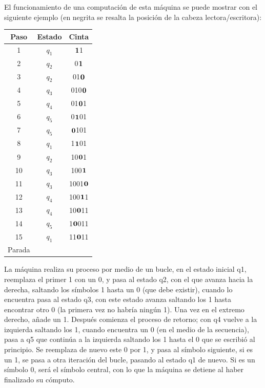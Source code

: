 \documentclass[12pt,a4paper,spanish]{book}
\begin{document}
\begin{itemize}
El funcionamiento de una computaci\'on de esta m\'aquina se puede mostrar con el siguiente ejemplo (en negrita se resalta la posici\'on de la cabeza lectora/escritora):\\
\begin{center}
\begin{tabular}{||c|c|c||}
\hline
Paso & Estado & Cinta\\
\hline
1 & $q_{1}$ & $\bf{1}$1\\
\hline
2 & $q_{2}$ & 0$\bf{1}$\\
\hline
3 & $q_{2}$ & 01$\bf{0}$\\
\hline
4 & $q_{3}$ & 010$\bf{0}$\\
\hline
5 & $q_{4}$ & 01$\bf{0}$1\\
\hline
6 & $q_{5}$ & 0$\bf{1}$01\\
\hline
7 & $q_{5}$ & $\bf{0}$101\\
\hline
8 & $q_{1}$ & 1$\bf{1}$01\\
\hline
9 & $q_{2}$ & 10$\bf{0}$1\\
\hline
10 & $q_{3}$ & 100$\bf{1}$\\
\hline
11 & $q_{3}$ & 1001$\bf{0}$\\
\hline
12 & $q_{4}$ & 100$\bf{1}$1\\
\hline
13 & $q_{4}$ & 10$\bf{0}$11\\
\hline
14 & $q_{5}$ & 1$\bf{0}$011\\
\hline
15 & $q_{1}$ & 11$\bf{0}$11\\
\hline
Parada & &\\
\hline
\end{tabular}
\end{center}

La m\'aquina realiza su proceso por medio de un bucle, en el estado inicial q1, reemplaza el primer 1 con un 0, y pasa al estado q2, con el que avanza hacia la derecha, saltando los s\'imbolos 1 hasta un 0 (que debe existir), cuando lo encuentra pasa al estado q3, con este estado avanza saltando los 1 hasta encontrar otro 0 (la primera vez no habr\'ia ning\'un 1). Una vez en el extremo derecho, a\~nade un 1. Despu\'es comienza el proceso de retorno; con q4 vuelve a la izquierda saltando los 1, cuando encuentra un 0 (en el medio de la secuencia), pasa a q5 que contin\'ua a la izquierda saltando los 1 hasta el 0 que se escribi\'o al principio. Se reemplaza de nuevo este 0 por 1, y pasa al s\'imbolo siguiente, si es un 1, se pasa a otra iteraci\'on del bucle, pasando al estado q1 de nuevo. Si es un s\'imbolo 0, ser\'a el s\'imbolo central, con lo que la m\'aquina se detiene al haber finalizado su c\'omputo.
\end{itemize}
\end{document}
